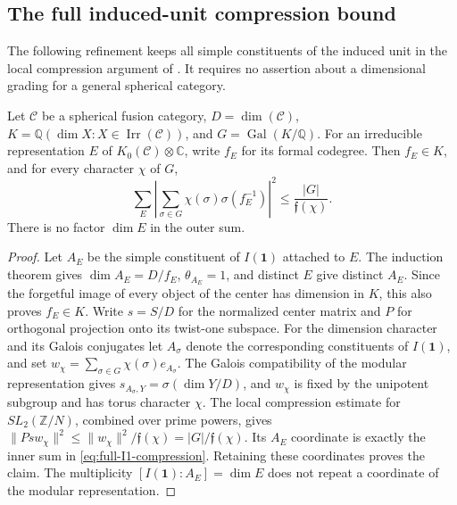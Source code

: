 
\subsection{The full induced-unit compression bound}
\label{subsec:full-I1-compression}
The following refinement keeps all simple constituents of the induced
unit in the local compression argument of
\cite[Lemma~4.1 and proof of Theorem~5.1]{SchopierayDimensionBlock}.
It requires no assertion about a dimensional grading for a general
spherical category.

\begin{proposition}
Let $\mathcal C$ be a spherical fusion category, $D=\dim(\mathcal C)$,
$K=\mathbb Q(\dim X:X\in\operatorname{Irr}(\mathcal C))$, and
$G=\operatorname{Gal}(K/\mathbb Q)$.  For an irreducible representation
$E$ of $K_0(\mathcal C)\otimes\mathbb C$, write $f_E$ for its formal
codegree.  Then $f_E\in K$, and for every character $\chi$ of $G$,
\begin{equation}\label{eq:full-I1-compression}
 \sum_E\left|\sum_{\sigma\in G}
       \chi(\sigma)\sigma(f_E^{-1})\right|^2
       \leq \frac{|G|}{\mathfrak f(\chi)}.
\end{equation}
There is no factor $\dim E$ in the outer sum.
\end{proposition}

\begin{proof}
Let $A_E$ be the simple constituent of $I(\mathbf1)$ attached to $E$.
The induction theorem \cite[Theorem~2.13]{OstrikRank3} gives
$\dim A_E=D/f_E$, $\theta_{A_E}=1$, and distinct $E$ give distinct
$A_E$.  Since the forgetful image of every object of the center has
dimension in $K$, this also proves $f_E\in K$.
Write $s=S/D$ for the normalized center matrix and $P$ for orthogonal
projection onto its twist-one subspace.  For the dimension character and
its Galois conjugates let $A_\sigma$ denote the corresponding constituents
of $I(\mathbf1)$, and set
$w_\chi=\sum_{\sigma\in G}\chi(\sigma)e_{A_\sigma}$.
The Galois compatibility of the modular representation gives
$s_{A_\sigma,Y}=\sigma(\dim Y/D)$, and $w_\chi$ is fixed by the
unipotent subgroup and has torus character $\chi$.  The local compression
estimate for $SL_2(\mathbb Z/N)$, combined over prime powers, gives
$\|Ps w_\chi\|^2\leq\|w_\chi\|^2/\mathfrak f(\chi)
=|G|/\mathfrak f(\chi)$.
Its $A_E$ coordinate is exactly the inner sum in
\eqref{eq:full-I1-compression}.  Retaining these coordinates proves the
claim.  The multiplicity $[I(\mathbf1):A_E]=\dim E$ does not repeat a
coordinate of the modular representation.
\end{proof}

